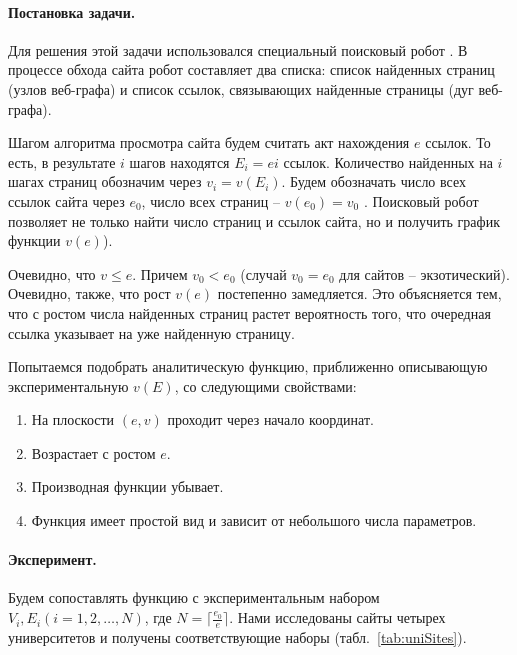 \paragraph{Постановка задачи.} Для решения этой задачи использовался специальный поисковый робот \cite{BlekanovSergeevMartynenko}. В процессе обхода сайта робот составляет два списка: список найденных страниц (узлов веб-графа) и список ссылок, связывающих найденные страницы (дуг веб-графа).

Шагом алгоритма просмотра сайта будем считать акт нахождения \(e\) ссылок. То есть, в результате \(i\) шагов находятся \(E_i = ei\) ссылок. Количество найденных на \(i\) шагах страниц обозначим через \(v_i = v(E_i)\). Будем обозначать число всех ссылок сайта через \(e_0\), число всех страниц -- \(v(e_0) = v_0\) . Поисковый робот позволяет не только найти число страниц и ссылок сайта, но и получить график функции \(v(e)\)).

Очевидно, что \(v \leq e \). Причем \(v_0 < e_0\) (случай \(v_0 = e_0\) для сайтов -- экзотический). Очевидно, также, что рост \(v(e)\) постепенно замедляется. Это объясняется тем, что с ростом числа найденных страниц растет вероятность того, что очередная ссылка указывает на уже найденную страницу. 

Попытаемся подобрать аналитическую функцию, приближенно описывающую экспериментальную \(v(E)\), со следующими свойствами:
\begin{enumerate}
	\item На плоскости \((e, v)\) проходит через начало координат.
	\item Возрастает с ростом \(e\).
	\item Производная функции убывает.
	\item Функция имеет простой вид и зависит от небольшого числа параметров.
\end{enumerate}

\paragraph{Эксперимент.} Будем сопоставлять функцию с экспериментальным набором \(V_i, E_i (i = 1,2, \dots, N)\), где \(N = \lceil \frac{e_0}{e} \rceil\). Нами исследованы сайты четырех университетов и получены соответствующие наборы (табл.~\cref{tab:uniSites}).

